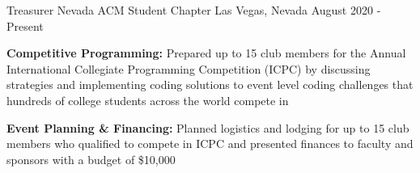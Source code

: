 
\begin{cventries}

  \cventry
    {Treasurer} %
    {Nevada ACM Student Chapter} %
    {Las Vegas, Nevada} %
    {August 2020 - Present} %
    {
      \begin{cvitems} %
        \item {\textbf{Competitive Programming:} Prepared up to 15 club members for the Annual International Collegiate Programming Competition (ICPC) by discussing strategies and implementing coding solutions to event level coding challenges that hundreds of college students across the world compete in}
        \item {\textbf{Event Planning \& Financing:} Planned logistics and lodging for up to 15 club members who qualified to compete in ICPC and presented finances to faculty and sponsors with a budget of \$10,000}
      \end{cvitems}
    }




    
    
\end{cventries}
